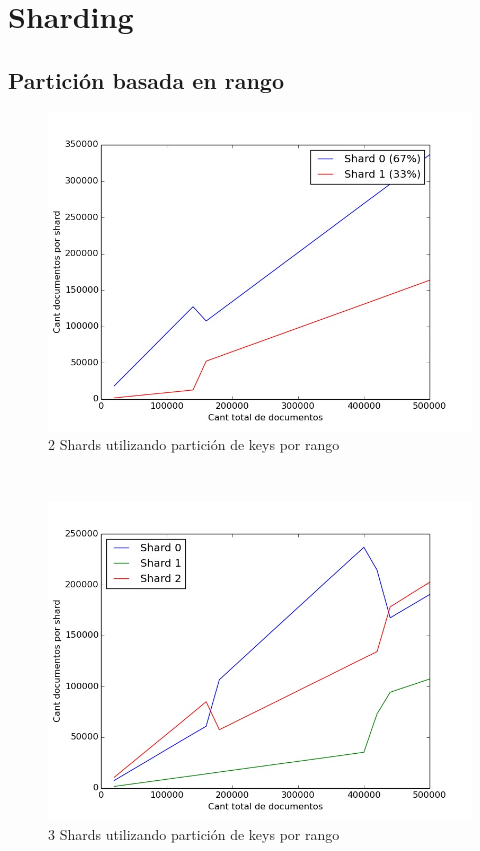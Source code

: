 \section{Sharding}

\subsection{Partición basada en rango}

\begin{figure}[!h]
  \begin{center}
      \includegraphics[scale=0.4]{imagenes/range1.jpg}
      \caption{2 Shards utilizando partición de keys por rango}
      \label{fig:contra1}
  \end{center}
\end{figure}

~

\begin{figure}[!h]
  \begin{center}
      \includegraphics[scale=0.4]{imagenes/range2.jpg}
      \caption{3 Shards utilizando partición de keys por rango}
      \label{fig:contra1}
  \end{center}
\end{figure}

